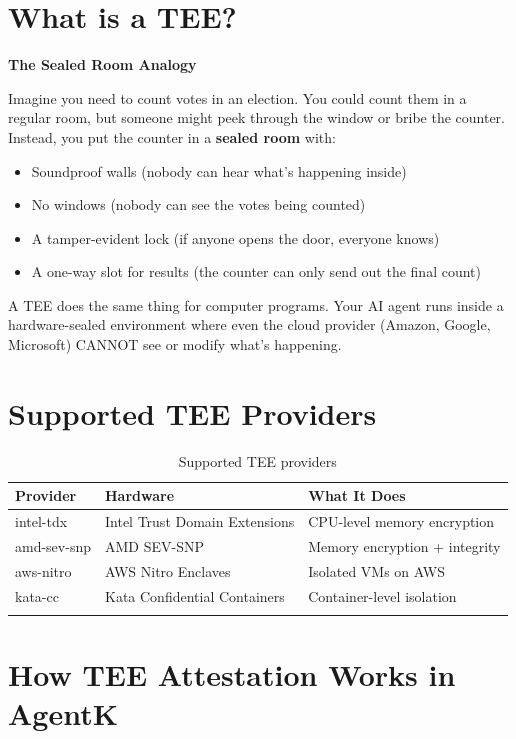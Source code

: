 \documentclass[12pt,a4paper,openany]{report}
\begin{document}
\section{What is a TEE?}

\begin{analogybox}
\textbf{The Sealed Room Analogy}

Imagine you need to count votes in an election. You could count them in a regular room, but someone might peek through the window or bribe the counter. Instead, you put the counter in a \textbf{sealed room} with:
\begin{itemize}
    \item Soundproof walls (nobody can hear what's happening inside)
    \item No windows (nobody can see the votes being counted)
    \item A tamper-evident lock (if anyone opens the door, everyone knows)
    \item A one-way slot for results (the counter can only send out the final count)
\end{itemize}

A TEE does the same thing for computer programs. Your AI agent runs inside a hardware-sealed environment where even the cloud provider (Amazon, Google, Microsoft) CANNOT see or modify what's happening.
\end{analogybox}

\section{Supported TEE Providers}

\begin{longtable}{p{3.5cm}p{4cm}p{5.5cm}}
\toprule
\textbf{Provider} & \textbf{Hardware} & \textbf{What It Does} \\
\midrule
intel-tdx & Intel Trust Domain Extensions & CPU-level memory encryption \\
amd-sev-snp & AMD SEV-SNP & Memory encryption + integrity \\
aws-nitro & AWS Nitro Enclaves & Isolated VMs on AWS \\
kata-cc & Kata Confidential Containers & Container-level isolation \\
\bottomrule
\caption{Supported TEE providers}
\end{longtable}

\section{How TEE Attestation Works in AgentK}
\end{document}
